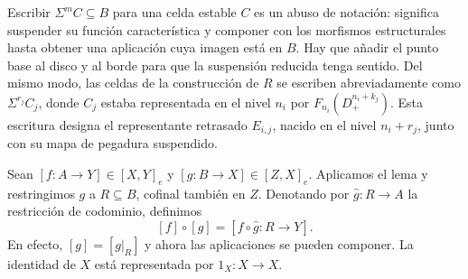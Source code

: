 \begin{nota}
Escribir $\Sigma^mC\subseteq B$ para una celda estable $C$ es un abuso de notación: significa suspender su función característica y componer con los morfismos estructurales hasta obtener una aplicación cuya imagen está en $B$. Hay que añadir el punto base al disco y al borde para que la suspensión reducida tenga sentido. Del mismo modo, las celdas de la construcción de $R$ se escriben abreviadamente como $\Sigma^{r_j}C_j$, donde $C_j$ estaba representada en el nivel $n_i$ por $F_{n_i}(D^{n_i+k_j}_+)$. Esta escritura designa el representante retrasado $E_{i,j}$, nacido en el nivel $n_i+r_j$, junto con su mapa de pegadura suspendido.
\end{nota}

Sean $[f\colon A\to Y]\in[X,Y]_e$ y $[g\colon B\to X]\in[Z,X]_e$. Aplicamos el lema y restringimos $g$ a $R\subseteq B$, cofinal también en $Z$. Denotando por $\widehat g\colon R\to A$ la restricción de codominio, definimos
\[
[f]\circ[g]=[f\circ\widehat g\colon R\to Y].
\]
En efecto, $[g]=[g|_R]$ y ahora las aplicaciones se pueden componer. La identidad de $X$ está representada por $1_X\colon X\to X$.


